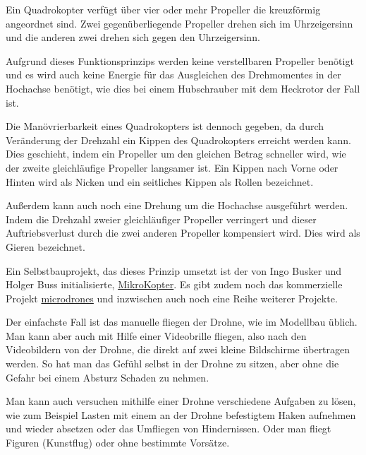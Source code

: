 Ein Quadrokopter verfügt über vier oder mehr Propeller die kreuzförmig angeordnet sind.
Zwei gegenüberliegende Propeller drehen sich im Uhrzeigersinn
und die anderen zwei drehen sich gegen den Uhrzeigersinn.

Aufgrund dieses Funktionsprinzips werden keine verstellbaren Propeller benötigt
und es wird auch keine Energie für das Ausgleichen des Drehmomentes in der Hochachse benötigt,
wie dies bei einem Hubschrauber mit dem Heckrotor der Fall ist.

Die Manövrierbarkeit eines Quadrokopters ist dennoch gegeben,
da durch Veränderung der Drehzahl ein Kippen des Quadrokopters erreicht werden kann.
Dies geschieht, indem ein Propeller um den gleichen Betrag schneller wird, wie der zweite
gleichläufige Propeller langsamer ist.
Ein Kippen nach Vorne oder Hinten wird als Nicken
und ein seitliches Kippen als Rollen bezeichnet.

Außerdem kann auch noch eine Drehung um die Hochachse ausgeführt werden.
Indem die Drehzahl zweier gleichläufiger Propeller verringert
und dieser Auftriebsverlust durch die zwei anderen Propeller kompensiert wird.
Dies wird als Gieren bezeichnet.

Ein Selbstbauprojekt, das dieses Prinzip umsetzt ist der von
Ingo Busker und Holger Buss initialisierte, \href{http://www.mikrokopter.de}{MikroKopter}.
Es gibt zudem noch das kommerzielle Projekt \href{http://www.microdrones.com}{microdrones}
und inzwischen auch noch eine Reihe weiterer Projekte.

\bigskip
Der einfachste Fall ist das manuelle fliegen der Drohne, wie im Modellbau üblich.
Man kann aber auch mit Hilfe einer Videobrille fliegen,
also nach den Videobildern von der Drohne, die direkt auf zwei
kleine Bildschirme übertragen werden. So hat man das Gefühl selbst in
der Drohne zu sitzen, aber ohne die Gefahr bei einem Absturz Schaden zu
nehmen.

Man kann auch versuchen mithilfe einer Drohne verschiedene Aufgaben zu lösen,
wie zum Beispiel Lasten mit einem an der Drohne befestigtem Haken aufnehmen
und wieder absetzen oder das Umfliegen von Hindernissen.
Oder man fliegt Figuren (Kunstflug) oder ohne bestimmte Vorsätze.


